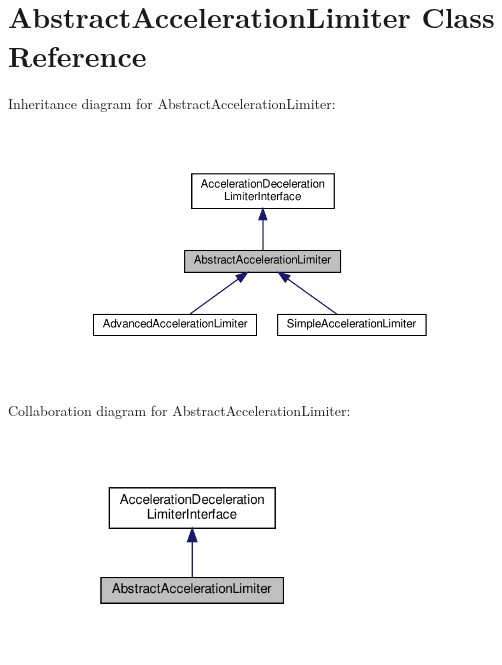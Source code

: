\hypertarget{classAbstractAccelerationLimiter}{}\section{Abstract\+Acceleration\+Limiter Class Reference}
\label{classAbstractAccelerationLimiter}


Inheritance diagram for Abstract\+Acceleration\+Limiter\+:
\nopagebreak
\begin{figure}[H]
\begin{center}
\leavevmode
\includegraphics[width=350pt]{classAbstractAccelerationLimiter__inherit__graph}
\end{center}
\end{figure}


Collaboration diagram for Abstract\+Acceleration\+Limiter\+:
\nopagebreak
\begin{figure}[H]
\begin{center}
\leavevmode
\includegraphics[width=217pt]{classAbstractAccelerationLimiter__coll__graph}
\end{center}
\end{figure}

